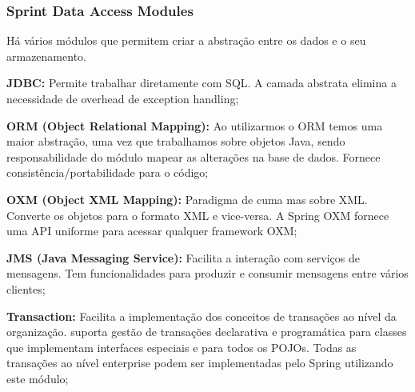 \documentclass{article}
\begin{document}
\pagebreak

\subsubsection{Sprint Data Access Modules}

Há vários módulos que permitem criar a abstração entre os dados e o seu armazenamento.

\begin{flushleft}
  \textbf{JDBC:} Permite trabalhar diretamente com SQL. A camada abstrata
  elimina a necessidade de overhead de exception handling;

  \vspace{2mm}

  \textbf{ORM (Object Relational Mapping):} Ao utilizarmos o ORM temos uma maior abstração, uma vez que trabalhamos sobre objetos Java, sendo
  responsabilidade do módulo mapear as alterações na base de dados.
  Fornece consistência/portabilidade para o código;

  \vspace{2mm}

  \textbf{OXM (Object XML Mapping):} Paradigma de cuma mas sobre XML.
  Converte os objetos para o formato XML e vice-versa. A Spring OXM
  fornece uma API uniforme para acessar qualquer framework OXM;

  \vspace{2mm}

  \textbf{JMS (Java Messaging Service):} Facilita a interação com serviços de
  mensagens. Tem funcionalidades para produzir e consumir mensagens
  entre vários clientes;

  \vspace{2mm}

  \textbf{Transaction:} Facilita a implementação dos conceitos de transações ao nível da organização.
  suporta gestão de transações declarativa e programática para classes que
  implementam interfaces especiais e para todos os POJOs. Todas as transações
  ao nível enterprise podem ser implementadas pelo Spring utilizando este módulo; 
\end{flushleft}
\end{document}
